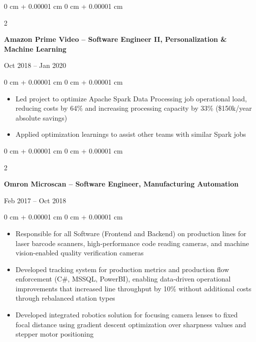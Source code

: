 \documentclass[10pt, letterpaper]{article}
\newenvironment{highlights}{
    \begin{itemize}[
        topsep=0.10 cm,
        parsep=0.10 cm,
        partopsep=0pt,
        itemsep=0pt,
        leftmargin=0 cm + 10pt
    ]
}{
    \end{itemize}
} %
\newenvironment{onecolentry}{
    \begin{adjustwidth}{
        0 cm + 0.00001 cm
    }{
        0 cm + 0.00001 cm
    }
}{
    \end{adjustwidth}
} %
\newenvironment{twocolentry}[2][]{
    \onecolentry
    \def\secondColumn{#2}
    \setcolumnwidth{\fill, 4.5 cm}
    \begin{paracol}{2}
}{
    \switchcolumn \raggedleft \secondColumn
    \end{paracol}
    \endonecolentry
} %
\begin{document}
        \vspace{0.2 cm}

        \begin{twocolentry}{
            Oct 2018 – Jan 2020
        }
            \textbf{Amazon Prime Video -- Software Engineer II, Personalization \& Machine Learning}
        \end{twocolentry}

        \vspace{0.10 cm}
        \begin{onecolentry}
            \begin{highlights}
                \item Led project to optimize Apache Spark Data Processing job operational load, reducing costs by 64\% and increasing processing capacity by 33\% (\$150k/year absolute savings)
                \item Applied optimization learnings to assist other teams with similar Spark jobs
            \end{highlights}
        \end{onecolentry}

        \vspace{0.2 cm}

        \begin{twocolentry}{
            Feb 2017 – Oct 2018
        }
            \textbf{Omron Microscan – Software Engineer, Manufacturing Automation}
        \end{twocolentry}

        \vspace{0.10 cm}
        \begin{onecolentry}
            \begin{highlights}
                \item Responsible for all Software (Frontend and Backend) on production lines for laser barcode scanners, high-performance code reading cameras, and machine vision-enabled quality verification cameras
                \item Developed tracking system for production metrics and production flow enforcement (C\#, MSSQL, PowerBI), enabling data-driven operational improvements that increased line throughput by 10\% without additional costs through rebalanced station types
                \item Developed integrated robotics solution for focusing camera lenses to fixed focal distance using gradient descent optimization over sharpness values and stepper motor positioning
            \end{highlights}
        \end{onecolentry}
\end{document}
